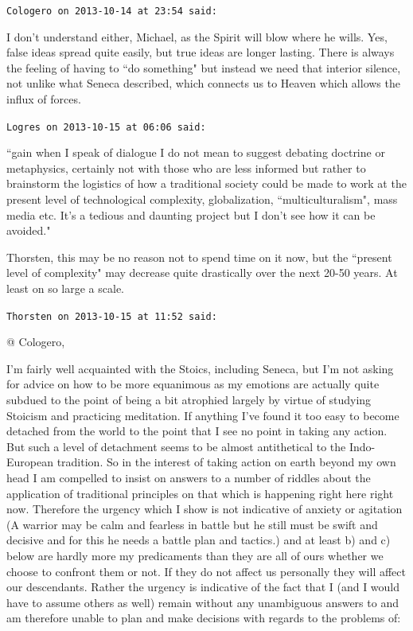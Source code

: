\begin{footnotesize}
\begin{sffamily}
\hfill

\texttt{Cologero on 2013-10-14 at 23:54 said: }

I don't understand either, Michael, as the Spirit will blow where he wills. Yes, false ideas spread
quite easily, but true ideas are longer lasting. There is always the feeling of having to ``do something" but instead we
need that interior silence, not unlike what Seneca described, which connects us to Heaven which allows the influx of
forces.


\hfill

\texttt{Logres on 2013-10-15 at 06:06 said: }

``gain when I speak of dialogue I do not mean to suggest debating doctrine or metaphysics, certainly not with those who
are less informed but rather to brainstorm the logistics of how a traditional society could be made to work at the
present level of technological complexity, globalization, ``multiculturalism", mass media etc. It's
a tedious and daunting project but I don't see how it can be avoided."

Thorsten, this may be no reason not to spend time on it now, but the ``present level of complexity" may decrease quite
drastically over the next 20-50 years. At least on so large a scale.


\hfill

\texttt{Thorsten on 2013-10-15 at 11:52 said: }

@ Cologero,

I'm fairly well acquainted with the Stoics, including Seneca, but I'm not
asking for advice on how to be more equanimous as my emotions are actually quite subdued to the point of being a bit
atrophied largely by virtue of studying Stoicism and practicing meditation. If anything I've found
it too easy to become detached from the world to the point that I see no point in taking any action. But such a level
of detachment seems to be almost antithetical to the Indo-European tradition. So in the interest of taking action on
earth beyond my own head I am compelled to insist on answers to a number of riddles about the application of
traditional principles on that which is happening right here right now. Therefore the urgency which I show is not
indicative of anxiety or agitation (A warrior may be calm and fearless in battle but he still must be swift and
decisive and for this he needs a battle plan and tactics.) and at least b) and c) below are hardly more my predicaments
than they are all of ours whether we choose to confront them or not. If they do not affect us personally they will
affect our descendants. Rather the urgency is indicative of the fact that I (and I would have to assume others as well)
remain without any unambiguous answers to and am therefore unable to plan and make decisions with regards to the
problems of:


\end{sffamily}
\end{footnotesize}
